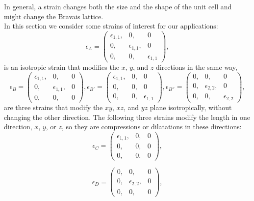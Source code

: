 \documentclass[12pt,a4paper]{article}
\begin{document}
In general, a strain changes both the size 
and the shape of the unit cell and might change the Bravais lattice. \\
In this section we consider some strains of interest for our applications: 
\begin{equation}
\epsilon_A=\left( \begin{array}{ccc}
\epsilon_{1,1}, & 0, & 0 
\\
0,& \epsilon_{1,1}, & 0 
\\
0,& 0, & \epsilon_{1,1}
\end{array}
\right),
\end{equation}
is an isotropic strain that modifies the $x$, $y$, and $z$ directions in the
same way,
\begin{equation}
\epsilon_B=\left( \begin{array}{ccc}
\epsilon_{1,1},& 0, & 0 
\\
0, & \epsilon_{1,1}, &  0 
\\
0, & 0, &  0
\end{array}
\right),
\epsilon_{B'}=\left( \begin{array}{ccc}
\epsilon_{1,1},& 0, & 0 
\\
0, & 0, &  0
\\
0, & 0, & \epsilon_{1,1}
\end{array}
\right),
\epsilon_{B''}=\left( \begin{array}{ccc}
0, & 0, & 0 
\\
0, & \epsilon_{2,2}, &  0
\\
0, & 0, & \epsilon_{2,2}
\end{array}
\right),
\end{equation}
are three strains that modify the $xy$, $xz$, and $yz$ plane 
isotropically, without changing the other direction.
The following three strains modify the length in one direction, 
$x$, $y$, or $z$, so they are compressions or dilatations in these directions:
\begin{equation}
\epsilon_C=\left( \begin{array}{ccc}
\epsilon_{1,1}, & 0, & 0 
\\
0, & 0, & 0 
\\
0, & 0, & 0
\end{array}
\right),
\end{equation}

\begin{equation}
\epsilon_D=\left( \begin{array}{ccc}
0, & 0, & 0 
\\
0, &  \epsilon_{2,2}, & 0 
\\
0, & 0, & 0
\end{array}
\right),
\end{equation}
\end{document}
